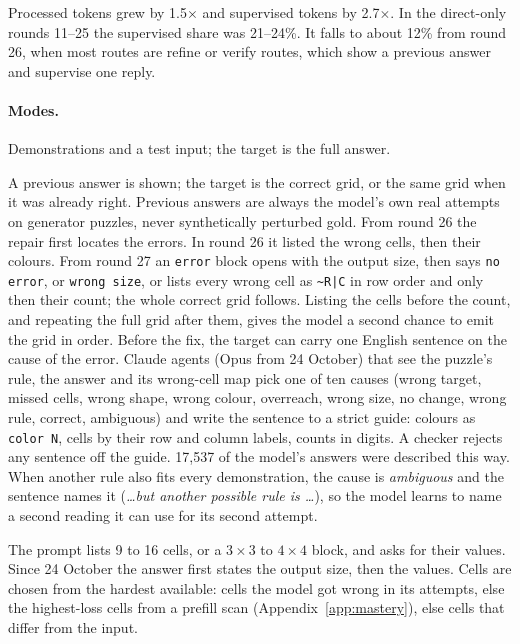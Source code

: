 \documentclass[11pt]{article}
\begin{document}
\noindent Processed tokens grew by 1.5$\times$ and supervised tokens by
2.7$\times$. In the direct-only rounds 11--25 the supervised share was
21--24\%. It falls to about 12\% from round 26, when most routes are refine or
verify routes, which show a previous answer and supervise one reply.

\paragraph{Modes.}
\begin{description}[nosep,leftmargin=1.5em]
  \item[Direct.] Demonstrations and a test input; the target is the full answer.
  \item[Refine.] A previous answer is shown; the target is the correct grid, or the same grid when it was already right. Previous answers are always the model's own real attempts on generator puzzles, never synthetically perturbed gold. From round 26 the repair first locates the errors. In round 26 it listed the wrong cells, then their colours. From round 27 an \texttt{error} block opens with the output size, then says \texttt{no error}, or \texttt{wrong size}, or lists every wrong cell as \texttt{\textasciitilde R|C} in row order and only then their count; the whole correct grid follows. Listing the cells before the count, and repeating the full grid after them, gives the model a second chance to emit the grid in order. Before the fix, the target can carry one English sentence on the cause of the error. Claude agents (Opus from 24 October) that see the puzzle's rule, the answer and its wrong-cell map pick one of ten causes (wrong target, missed cells, wrong shape, wrong colour, overreach, wrong size, no change, wrong rule, correct, ambiguous) and write the sentence to a strict guide: colours as \texttt{color N}, cells by their row and column labels, counts in digits. A checker rejects any sentence off the guide. 17,537 of the model's answers were described this way. When another rule also fits every demonstration, the cause is \emph{ambiguous} and the sentence names it (\emph{\dots but another possible rule is \dots}), so the model learns to name a second reading it can use for its second attempt.
  \item[Points.] The prompt lists 9 to 16 cells, or a $3\times3$ to $4\times4$ block, and asks for their values. Since 24 October the answer first states the output size, then the values. Cells are chosen from the hardest available: cells the model got wrong in its attempts, else the highest-loss cells from a prefill scan (Appendix~\ref{app:mastery}), else cells that differ from the input.

\end{description}
\end{document}

